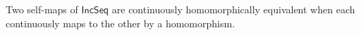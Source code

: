 \begin{definition}
Two self-maps of $\mathsf{IncSeq}$ are continuously homomorphically
equivalent when each continuously maps to
the other by a homomorphism.
\end{definition}
